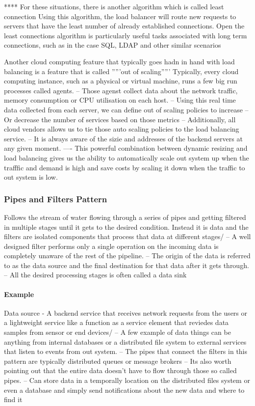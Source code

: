 \documentclass[a4paper, 11pt]{book}
\begin{document}
    **** For these situations, there is another algorithm which is called least connection
    Using this algorithm, the load balancer will route new requests to servers that have the least number of already established connections.
    Open the least connections algorithm is particularly useful tasks associated with long term connections, such as in the case SQL, LDAP and other similar scenarios

    Another cloud computing feature that typically goes hadn in hand with load balancing is a feature that is called '''''out of scaling'''''
    Typically, every cloud computing instance, such as a physical or virtual machine, runs a few big run processes called agents.
    -- Those agenst collect data about the network traffic, memory consumption or CPU utilisation on each host.
    -- Using this real time data collected from each server, we can define out of scaling policies to increase
    -- Or decrease the number of services based on those metrics
    -- Additionally, all cloud vendors allows us to tie those auto scaling policies to the load balancing service.
    -- It is always aware of the sizie and addresses of the backend servers at any given moment.
    ---- This powerful combination between dynamic resizing and load balancing gives us the ability to automatically scale out system up when the trafffic and demand is high and save costs by scaling it down when the traffic to out system is low.

    \subsubsection{Pipes and Filters Pattern}
    Follows the stream of water flowing through a series of pipes and getting filtered in multiple stages until it gets to the desired condition.
    Instead it is data and the filters are isolated components that process that data at different stages/
    -- A well designed filter performs only a single operation on the incoming data is completely unaware of the rest of the pipeline.
    -- The origin of the data is referred to as the data source and the final destination for that data after it gets through.
    -- All the desired processing stages is often called a data sink

    \paragraph{Example}
    Data source - A backend service that receives network requests from the users or a lightweight service like a function as a service element that reviedes data samples from sensor or end devices/
    -- A few example of data things can be anything from internal databases or a distributed file system to external services that listen to events from out system.
    -- The pipes that connect the filters in this pattern are typically distributed queues or message brokers
    -- Its also worth pointing out that the entire data doesn't have to flow through those so called pipes.
    -- Can store data in a temporally location on the distributed files system or even a database and simply send notifications about the new data and where to find it
\end{document}
